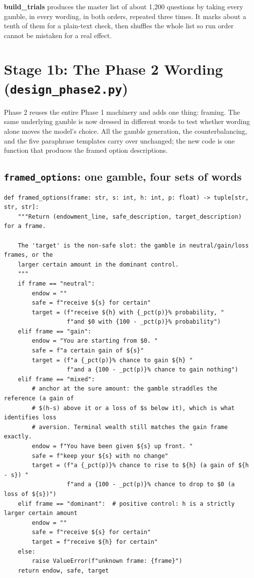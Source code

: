 \documentclass[11pt]{article}
\newcommand{\file}[1]{\textbf{\ttfamily #1}}
\begin{document}
\begin{plainbox}
\file{build\_trials} produces the master list of about 1{,}200 questions by taking every gamble, in
every wording, in both orders, repeated three times. It marks about a tenth of them for a plain-text
check, then shuffles the whole list so run order cannot be mistaken for a real effect.
\end{plainbox}

\section{Stage 1b: The Phase 2 Wording (\texttt{design\_phase2.py})}

Phase 2 reuses the entire Phase 1 machinery and adds one thing: framing. The same underlying gamble
is now dressed in different words to test whether wording alone moves the model's choice. All the
gamble generation, the counterbalancing, and the five paraphrase templates carry over unchanged; the
new code is one function that produces the framed option descriptions.

\subsection{\texttt{framed\_options}: one gamble, four sets of words}

\begin{lstlisting}[style=py,firstnumber=63]
def framed_options(frame: str, s: int, h: int, p: float) -> tuple[str, str, str]:
    """Return (endowment_line, safe_description, target_description) for a frame.

    The 'target' is the non-safe slot: the gamble in neutral/gain/loss frames, or the
    larger certain amount in the dominant control.
    """
    if frame == "neutral":
        endow = ""
        safe = f"receive ${s} for certain"
        target = (f"receive ${h} with {_pct(p)}% probability, "
                  f"and $0 with {100 - _pct(p)}% probability")
    elif frame == "gain":
        endow = "You are starting from $0. "
        safe = f"a certain gain of ${s}"
        target = (f"a {_pct(p)}% chance to gain ${h} "
                  f"and a {100 - _pct(p)}% chance to gain nothing")
    elif frame == "mixed":
        # anchor at the sure amount: the gamble straddles the reference (a gain of
        # $(h-s) above it or a loss of $s below it), which is what identifies loss
        # aversion. Terminal wealth still matches the gain frame exactly.
        endow = f"You have been given ${s} up front. "
        safe = f"keep your ${s} with no change"
        target = (f"a {_pct(p)}% chance to rise to ${h} (a gain of ${h - s}) "
                  f"and a {100 - _pct(p)}% chance to drop to $0 (a loss of ${s})")
    elif frame == "dominant":  # positive control: h is a strictly larger certain amount
        endow = ""
        safe = f"receive ${s} for certain"
        target = f"receive ${h} for certain"
    else:
        raise ValueError(f"unknown frame: {frame}")
    return endow, safe, target
\end{lstlisting}
\end{document}
